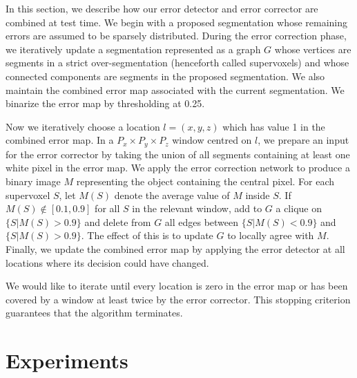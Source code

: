 \documentclass{article}
\begin{document}
In this section, we describe how our error detector and error corrector are combined at test time. We begin with a proposed segmentation whose remaining errors are assumed to be sparsely distributed. During the error correction phase, we iteratively update a segmentation represented as a graph $G$ whose vertices are segments in a strict over-segmentation (henceforth called supervoxels) and whose connected components are segments in the proposed segmentation. We also maintain the combined error map associated with the current segmentation. We binarize the error map by thresholding at 0.25.

Now we iteratively choose a location $l=(x,y,z)$ which has value 1 in the combined error map. In a $P_x \times P_y \times P_z$ window centred on $l$, we prepare an input for the error corrector by taking the union of all segments containing at least one white pixel in the error map. We apply the error correction network to produce a binary image $M$ representing the object containing the central pixel. For each supervoxel $S$, let $M(S)$ denote the average value of $M$ inside $S$. If $M(S) \not \in [0.1,0.9]$ for all $S$ in the relevant window, add to $G$ a clique on $\{S | M(S) > 0.9\}$ and delete from $G$ all edges between $\{S | M(S) < 0.9\}$ and $\{S | M(S) > 0.9\}$. The effect of this is to update $G$ to locally agree with $M$. Finally, we update the combined error map by applying the error detector at all locations where its decision could have changed.

We would like to iterate until every location is zero in the error map or has been covered by a window at least twice by the error corrector. This stopping criterion guarantees that the algorithm terminates.



\section{Experiments}
\end{document}
